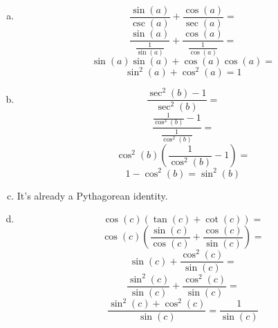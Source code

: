\documentclass[11pt]{article}
\begin{document}
\begin{enumerate}[a.]
\item $$\frac{\sin(a)}{\csc(a)} + \frac{\cos(a)}{\sec(a)} =$$
$$\frac{\sin(a)}{\frac{1}{\sin(a)}} + \frac{\cos(a)}{\frac{1}{\cos(a)}} =$$
$$\sin(a)\sin(a) + \cos(a)\cos(a) =$$
$$\sin^2(a) + \cos^2(a) = 1$$
\item $$\frac{\sec^2(b)-1}{\sec^2(b)} =$$
$$\frac{\frac{1}{\cos^2(b)}-1}{\frac{1}{\cos^2(b)}} =$$
$$\cos^2(b)(\frac{1}{\cos^2(b)}-1) =$$
$$1 - \cos^2(b) = \sin^2(b)$$
\item It's already a Pythagorean identity.
\item $$\cos(c)(\tan(c)+\cot(c)) =$$
$$\cos(c)(\frac{\sin(c)}{\cos(c)} + \frac{\cos(c)}{\sin(c)})=$$
$$\sin(c) + \frac{\cos^2(c)}{\sin(c)}=$$
$$\frac{\sin^2(c)}{\sin(c)} + \frac{\cos^2(c)}{\sin(c)}=$$
$$\frac{\sin^2(c) + \cos^2(c)}{\sin(c)} = \frac{1}{\sin(c)}$$
\end{enumerate}
\end{document}
